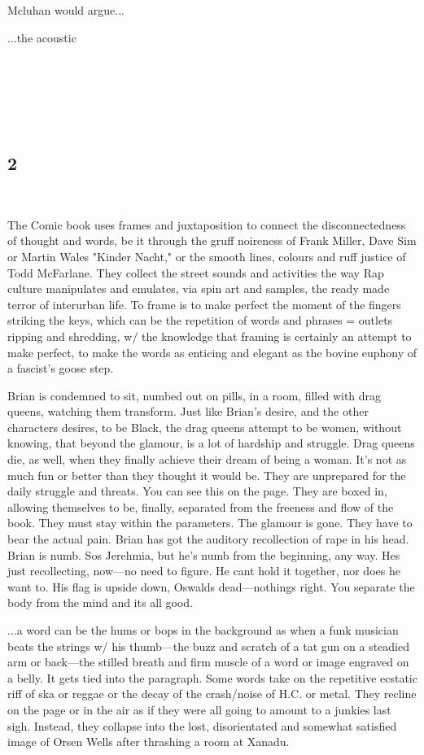 Mcluhan would argue...

...the acoustic

~

~

~

\hypertarget{section-1}{%
\subsection{2}\label{section-1}}

~

The Comic book uses frames and juxtaposition to connect the
disconnectedness of thought and words, be it through the gruff noireness
of Frank Miller, Dave Sim or Martin Wales "Kinder Nacht," or the smooth
lines, colours and ruff justice of Todd McFarlane. They collect the
street sounds and activities the way Rap culture manipulates and
emulates, via spin art and samples, the ready made terror of interurban
life. To frame is to make perfect the moment of the fingers striking the
keys, which can be the repetition of words and phrases = outlets ripping
and shredding, w/ the knowledge that framing is certainly an attempt to
make perfect, to make the words as enticing and elegant as the bovine
euphony of a fascist's goose step.

Brian is condemned to sit, numbed out on pills, in a room, filled with
drag queens, watching them transform. Just like Brian's desire, and the
other characters desires, to be Black, the drag queens attempt to be
women, without knowing, that beyond the glamour, is a lot of hardship
and struggle. Drag queens die, as well, when they finally achieve their
dream of being a woman. It's not as much fun or better than they thought
it would be. They are unprepared for the daily struggle and threats. You
can see this on the page. They are boxed in, allowing themselves to be,
finally, separated from the freeness and flow of the book. They must
stay within the parameters. The glamour is gone. They have to bear the
actual pain. Brian has got the auditory recollection of rape in his
head. Brian is numb. Sos Jerehmia, but he's numb from the beginning, any
way. Hes just recollecting, now---no need to figure. He cant hold it
together, nor does he want to. His flag is upside down, Oswalds
dead---nothings right. You separate the body from the mind and its all
good.

...a word can be the hums or bops in the background as when a funk
musician beats the strings w/ his thumb---the buzz and scratch of a tat
gun on a steadied arm or back---the stilled breath and firm muscle of a
word or image engraved on a belly. It gets tied into the paragraph. Some
words take on the repetitive ecstatic riff of ska or reggae or the decay
of the crash/noise of H.C. or metal. They recline on the page or in the
air as if they were all going to amount to a junkies last sigh. Instead,
they collapse into the lost, disorientated and somewhat satisfied image
of Orsen Wells after thrashing a room at Xanadu.


